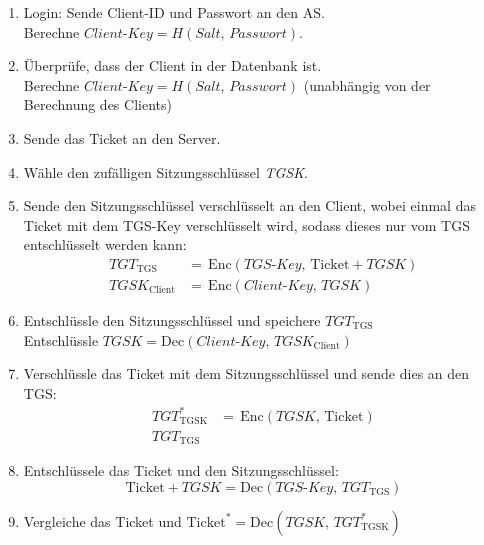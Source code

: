 \documentclass[a4paper, 11pt, accentcolor = tud3b]{tudreport}
\newcommand{\Enc}{\ensuremath{\textrm{Enc}}}
\newcommand{\Dec}{\ensuremath{\textrm{Dec}}}
\begin{document}
	            \begin{enumerate}
	            	\item Login: Sende Client-ID und Passwort an den AS. \\ Berechne \( \textit{Client-Key} = H(\textit{Salt},\, \textit{Passwort}) \).
	            	\item Überprüfe, dass der Client in der Datenbank ist. \\ Berechne \( \textit{Client-Key} = H(\textit{Salt},\, \textit{Passwort}) \) (unabhängig von der Berechnung des Clients)
	            	\item Sende das Ticket an den Server.
	            	\item Wähle den zufälligen Sitzungsschlüssel \textit{TGSK}.
	            	\item Sende den Sitzungsschlüssel verschlüsselt an den Client, wobei einmal das Ticket mit dem TGS-Key verschlüsselt wird, sodass dieses nur vom TGS entschlüsselt werden kann:
		            	\begin{align*}
		            		\textit{TGT}_\textrm{TGS}     & =\, \Enc(\textit{TGS-Key},\, \textrm{Ticket}+\textit{TGSK}) \\
		            		\textit{TGSK}_\textrm{Client} & =\, \Enc(\textit{Client-Key},\, \textit{TGSK})
		            	\end{align*}
		            \item Entschlüssle den Sitzungsschlüssel und speichere \( \textit{TGT}_\textrm{TGS} \) \\ Entschlüssle \( \textit{TGSK} = \Dec(\textit{Client-Key},\, \textit{TGSK}_\textrm{Client}) \)
		            \item Verschlüssle das Ticket mit dem Sitzungsschlüssel und sende dies an den TGS:
			            \begin{align*}
			            	\textit{TGT}^*_\textrm{TGSK} & =\, \Enc(\textit{TGSK},\, \textrm{Ticket}) \\
			            	\textit{TGT}_\textrm{TGS}    &
			            \end{align*}
			        \item Entschlüssele das Ticket und den Sitzungsschlüssel:
				        \begin{equation*}
					        \textrm{Ticket}+\textit{TGSK} = \Dec(\textit{TGS-Key},\, \textit{TGT}_\textrm{TGS})
				        \end{equation*}
				    \item Vergleiche das Ticket und \( \textrm{Ticket}^* = \Dec(\textit{TGSK},\, \textit{TGT}^*_\textrm{TGSK}) \)

\end{enumerate}
\end{document}
